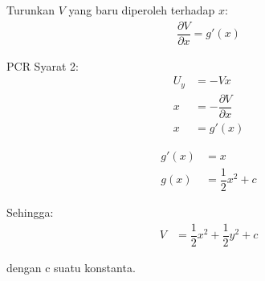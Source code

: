 \documentclass{article}
\begin{document}
    Turunkan $V$ yang baru diperoleh terhadap $x$:
    \begin{align}
        \dfrac{\partial V}{\partial x} = g'(x)
        \nonumber
    \end{align}

    PCR Syarat 2:
    \begin{align}
        U_y &= -Vx
        \nonumber\\
        x   &= -\dfrac{\partial V}{\partial x}
        \nonumber\\
        x   &= g'(x)
        \nonumber
    \end{align}

    \begin{align}
        g'(x)   &= x
        \nonumber\\
        g(x)    &= \dfrac{1}{2} x^2 + c
        \nonumber
    \end{align}
    
    Sehingga:
    \begin{align}
        V   &= \dfrac{1}{2} x^2 + \dfrac{1}{2} y^2 + c
        \nonumber
    \end{align}

    dengan c suatu konstanta.
\end{document}
